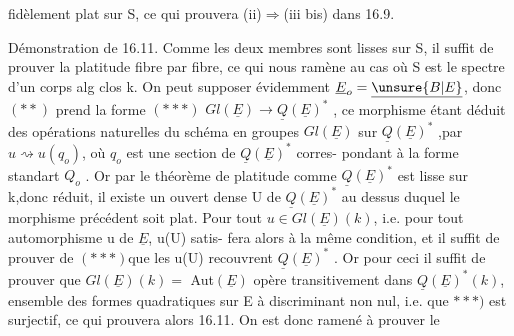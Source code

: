 
fidèlement plat sur S, ce qui prouvera  (ii)$\Longrightarrow$(iii bis) dans  16.9.

Démonstration de 16.11.  Comme les deux membres sont lisses sur S,
il suffit de prouver la platitude fibre par fibre, ce qui nous ramène au
cas où S est le spectre d'un corps alg clos k.  On peut  supposer
évidemment $\underline{E}_o=\underline{\unsure{B|E}}$, donc $(**)$ prend la forme
$(***)$   $Gl(\underline{E})\longrightarrow\underline{Q}(\underline{E})^*$ ,
ce morphisme étant déduit des opérations naturelles du schéma en groupes
$Gl(\underline{E})$ sur $\underline{Q}(\underline{E})^*$ ,par $u\rightsquigarrow u(q_o)$, où $q_o$ est une section de $\underline{Q}(\underline{E})^*$ corres-%
pondant à la forme standart $Q_o$ . Or par le théorème de platitude \hand{,}
comme $\underline{Q}(\underline{E})^*$ est lisse sur k,donc réduit, il existe un ouvert dense U de
$\underline{Q}(\underline{E})^*$ au dessus duquel le morphisme précédent soit plat.  Pour tout 
$u\in Gl(\underline{E})(k)$, i.e. pour tout automorphisme u de $\underline{E}$, u(U) satis-%
fera alors à la même condition, et il suffit\hand{,} de prouver\hand{),} 
de $(***)$\hand{,}que les u(U) recouvrent $\underline{Q}(\underline{E})^*$ . Or pour ceci il suffit de prouver
que $Gl(\underline{E})(k)=$ Aut$(\underline{E})$ opère transitivement dans $\underline{Q}(\underline{E})^*(k)$, ensemble des
formes quadratiques  sur \hand{$\checkmark$}E à discriminant non nul,  i.e. que
$***)$ est surjectif, ce \hand{\unsure{|}}qui prouvera alors 16.11.  On est donc ramené à
prouver le

